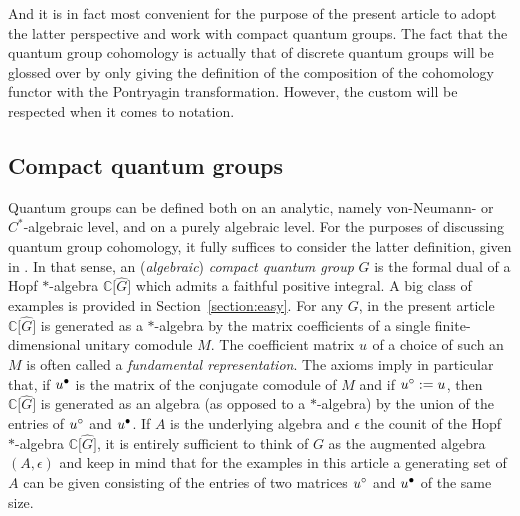 \documentclass[10pt,a4paper]{amsart}
\numberwithin{equation}{section}
\newcommand{\Scounit}{\epsilon}
\newcommand{\comps}{\mathbb{C}}
\newcommand{\blpoint}{\mathnormal{\bullet}}
\newcommand{\whpoint}{\mathnormal{\circ}}
\newcommand{\CQGdualC}[1]{\widehat{#1}}
\newcommand{\theqg}{G}
\newcommand{\theuni}{u}
\newcommand{\theunim}[1]{\theuni^{#1}}
\newcommand{\thecounit}{\Scounit}
\begin{document}
And it is in fact most convenient for the purpose of the present article to adopt the latter perspective and work with compact quantum groups. The fact that the quantum group cohomology is actually that of discrete quantum groups will be glossed over by only giving the definition of the composition of the cohomology functor with the Pontryagin transformation. However, the custom will be respected when it comes to notation.


\subsection{Compact quantum groups}
\label{section:quantum-groups-definition}
{
  \newcommand{\thealgebra}{A}
  \newcommand{\thefund}{\theunim{}}
  \newcommand{\thecomodule}{M}
  \newcommand{\thefundwh}{\theunim{\whpoint}}
  \newcommand{\thefundbl}{\theunim{\blpoint}}
  Quantum groups can be defined both on an analytic, namely von-Neumann- or $C^\ast$-algebraic level, and on a purely algebraic level. For the purposes of discussing quantum group cohomology, it fully suffices to consider the latter definition, given in \cite{DijkhuizenKoornwinder1994}. In that sense, an (\emph{algebraic}) \emph{compact quantum group} $\theqg$ is the formal dual of a Hopf $\ast$-algebra $\comps\bigl[\CQGdualC{\theqg}\bigr]$ which admits a faithful positive integral. A big class of examples is provided in Section~\ref{section:easy}. For any $\theqg$, in the present article $\comps \bigl[\CQGdualC{\theqg} \bigr]$ is generated as a $\ast$-algebra by the matrix coefficients of a single finite-dimensional unitary comodule $\thecomodule$. The coefficient matrix $\thefund$ of a choice of such an $\thecomodule$ is often called a \emph{fundamental representation}.
The axioms imply in particular that, if $\thefundbl$ is the matrix of the conjugate comodule of $\thecomodule$ and if $\thefundwh:= \thefund$, then $\comps \bigl[\CQGdualC{\theqg} \bigr]$ is generated as an algebra (as opposed to a $\ast$-algebra) by the union of the entries of $\thefundwh$ and $\thefundbl$. If $\thealgebra$ is the underlying algebra and $\thecounit$ the counit of the Hopf $\ast$-algebra  $\comps \bigl[\CQGdualC{\theqg} \bigr]$, it is entirely sufficient to think of $\theqg$ as the augmented algebra $(\thealgebra,\thecounit)$ and keep in mind that for the examples in this article a generating set of $\thealgebra$ can be given consisting of the entries of two matrices $\thefundwh$ and $\thefundbl$ of the same size.
}
\end{document}
